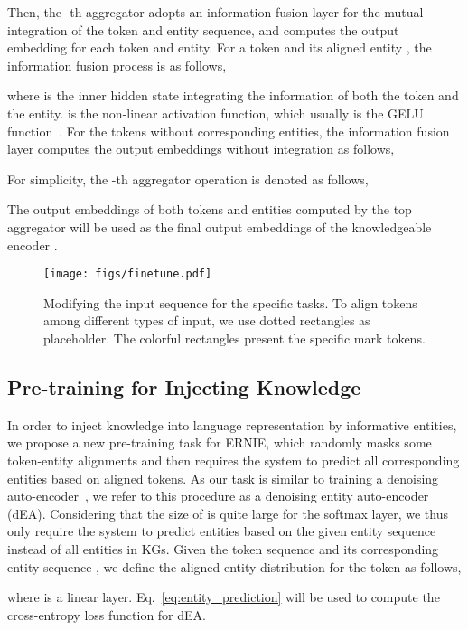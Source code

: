 \documentclass[11pt,a4paper]{article}
\begin{document}
Then, the -th aggregator adopts an information fusion layer for the mutual integration of the token and entity sequence, and computes the output embedding for each token and entity. For a token  and its aligned entity , the information fusion process is as follows,

where  is the inner hidden state integrating the information of both the token and the entity.  is the non-linear activation function, which usually is the GELU function~\cite{hendrycks2016gaussian}. For the tokens without corresponding entities, the information fusion layer computes the output embeddings without integration as follows,


For simplicity, the -th aggregator operation is denoted as follows,

The output embeddings of both tokens and entities computed by the top aggregator will be used as the final output embeddings of the knowledgeable encoder .

\begin{figure*}[t]
\centering
\texttt{[image: figs/finetune.pdf]}
\caption{Modifying the input sequence for the specific tasks. To align tokens among different types of input, we use dotted rectangles as placeholder. The colorful rectangles present the specific mark tokens.}
\label{fig:finetune}
\end{figure*}

\subsection{Pre-training for Injecting Knowledge}
\label{sec:loss}

In order to inject knowledge into language representation by informative entities, we propose a new pre-training task for ERNIE, which randomly masks some
token-entity alignments and then requires the system to predict all corresponding entities based on aligned tokens. As our task is similar to training a denoising auto-encoder~\cite{vincent2008extracting}, we refer to this procedure as a denoising entity auto-encoder (dEA). Considering that the size of  is quite large for the softmax layer, we thus only require the system to predict entities based on the given entity sequence instead of all entities in KGs. Given the token sequence  and its corresponding entity sequence , we define the aligned entity distribution for the token  as follows,

where  is a linear layer. Eq.~\ref{eq:entity_prediction} will be used to compute the cross-entropy loss function for dEA.
\end{document}
